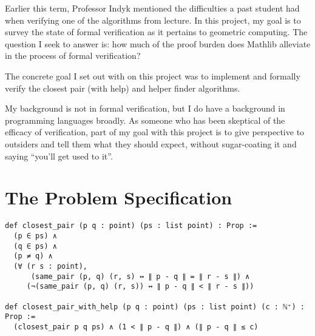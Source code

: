 \documentclass{article}
\begin{document}



Earlier this term, Professor Indyk mentioned the difficulties a past student had when verifying one of the algorithms from lecture.
In this project, my goal is to survey the state of formal verification as it pertains to geometric computing.
The question I seek to answer is: how much of the proof burden does Mathlib alleviate in the process of formal verification?


The concrete goal I set out with on this project was to implement and formally verify the closest pair (with help) and helper finder algorithms.

My background is not in formal verification, but I do have a background in programming languages broadly.
As someone who has been skeptical of the efficacy of verification, part of my goal with this project is to give perspective to outsiders and tell them what they should expect, without sugar-coating it and saying ``you'll get used to it''.

\section{The Problem Specification}

\begin{verbatim}
def closest_pair (p q : point) (ps : list point) : Prop :=
  (p ∈ ps) ∧
  (q ∈ ps) ∧
  (p ≠ q) ∧
  (∀ (r s : point),
      (same_pair (p, q) (r, s) ↔ ∥ p - q ∥ = ∥ r - s ∥) ∧
     (¬(same_pair (p, q) (r, s)) ↔ ∥ p - q ∥ < ∥ r - s ∥))

def closest_pair_with_help (p q : point) (ps : list point) (c : ℕ⁺) : Prop :=
  (closest_pair p q ps) ∧ (1 < ∥ p - q ∥) ∧ (∥ p - q ∥ ≤ c)
\end{verbatim}
\newpage
\end{document}
